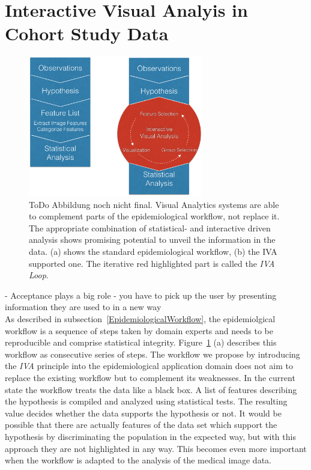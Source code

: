 \documentclass[journal]{style/vgtc} 			          %
\begin{document}
\section{Interactive Visual Analyis in Cohort Study Data}
\begin{figure}[htb]
 \centering
 \label{fig:WorkflowComparison}
 \includegraphics[width=3.0in]{figures/workflow_comparison}
 \caption{ToDo Abbildung noch nicht final. Visual Analytics systems are able to complement parts of the epidemiological workflow, not replace it. The appropriate combination of statistical- and interactive driven analysis shows promising potential to unveil the information in the data. (a) shows the standard epidemiological workflow, (b) the IVA supported one. The iterative red highlighted part is called the \emph{IVA Loop}.}
\end{figure}
- Acceptance plays a big role - you have to pick up the user by presenting information they are used to in a new way\\
%
As described in subsection~\ref{EpidemiologicalWorkflow}, the epidemiolgical workflow is a sequence of steps taken by domain experts and needs to be reproducible and comprise statistical integrity.
%
Figure~\ref{fig:WorkflowComparison} (a) describes this workflow as consecutive series of steps.
%
The workflow we propose by introducing the \emph{IVA} principle into the epidemiological application domain does not aim to replace the existing workflow but to complement its weaknesses.
%
In the current state the workflow treats the data like a black box.
%
A list of features describing the hypothesis is compiled and analyzed using statistical tests. 
%
The resulting value decides whether the data supports the hypothesis or not.
%
It would be possible that there are actually features of the data set which support the hypothesis by discriminating the population in the expected way, but with this approach they are not highlighted in any way.
%
This becomes even more important when the workflow is adapted to the analysis of the medical image data.
\end{document}
